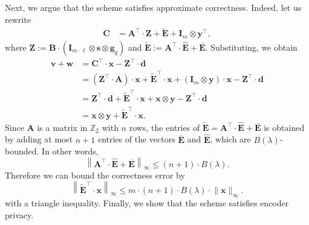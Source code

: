 \documentclass{article}
\newcommand{\Z}{\mathbb{Z}}
\renewcommand{\sec}{\ensuremath{\lambda}}
\newcommand{\id}{\ensuremath{\mathbf{I}}}
\begin{document}
Next, we argue that the scheme satisfies approximate correctness. Indeed, let us rewrite
\begin{align*}
    \mathbf{C}&=\mathbf{A}^\intercal \cdot \mathbf{Z}+ \mathbf{\widetilde{E}}+ \id_{m} \otimes \mathbf{y}^\intercal,
\end{align*}
where $\mathbf{Z}:=\mathbf{B}\cdot (\id_{m\cdot \ell}\otimes \mathbf{s}\otimes \mathbf{g}_q)$ and $\mathbf{\widetilde{E}}:=\mathbf{A}^\intercal\cdot \hat{\mathbf{E}}+ \overline{\mathbf{E}}$. Substituting,  we obtain
\begin{align*}
\mathbf{v}+\mathbf{w}&=\mathbf{C}^\intercal \cdot \mathbf{x}-\mathbf{Z}^\intercal \cdot \mathbf{d}\\
&=(\mathbf{Z}^\intercal \cdot \mathbf{A})\cdot \mathbf{x}+\mathbf{\widetilde{E}}^\intercal\cdot \mathbf{x}+(\id_{m} \otimes \mathbf{y})\cdot \mathbf{x}-\mathbf{Z}^\intercal \cdot \mathbf{d}\\
&=\mathbf{Z}^\intercal \cdot \mathbf{d}+\mathbf{\widetilde{E}}^\intercal\cdot \mathbf{x}+\mathbf{x} \otimes \mathbf{y}-\mathbf{Z}^\intercal \cdot \mathbf{d}\\
&=\mathbf{x} \otimes \mathbf{y}+\mathbf{\widetilde{E}}^\intercal\cdot \mathbf{x}.
\end{align*}
Since $\mathbf{A}$ is a matrix in $\Z_2$ with $n$ rows, the entries of $\mathbf{\widetilde{E}}=\mathbf{A}^\intercal\cdot \hat{\mathbf{E}}+\overline{\mathbf{E}}$ is obtained by adding at most $n+1$ entries of the vectors $\overline{\mathbf{E}}$ and $\hat{\mathbf{E}}$, which are $B(\sec)$-bounded. In other words, \[\left\lVert \mathbf{A}^\intercal \cdot \hat{\mathbf{E}}+\overline{\mathbf{E}}\right\rVert_\infty\le (n+1)\cdot B(\sec).\] 
Therefore we can bound the correctness error by 
\begin{equation}\label{eq:alpha_correct}
\left\lVert\mathbf{\widetilde{E}}^\intercal\cdot \mathbf{x}\right\rVert_\infty\le m\cdot (n+1) \cdot B(\sec)\cdot \lVert \mathbf{x}\rVert_\infty.
\end{equation}
with a triangle inequality. Finally, we show that the scheme satisfies encoder privacy.
\end{document}
